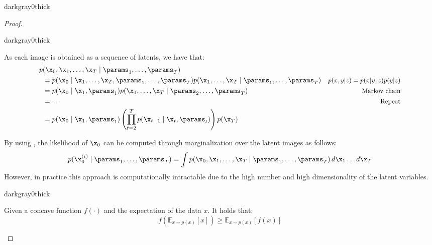 \begin{description}
\begin{description}
\begin{marginbar}{darkgray}{0}{thick}
\begin{proof}
                    \indenttbox
                    \begin{marginbar}{darkgray}{0}{thick}
                    \begin{lemma} \label{th:latents_joint}
                        As each image is obtained as a sequence of latents, we have that:
                        \begin{equation}
                            \begin{aligned}
                                p&(\x_0, \x_1, \dots, \x_T \mid \params_1, \dots, \params_T) \\
                                &= p(\x_0 \mid \x_1, \dots, \x_T, \params_1, \dots, \params_T) p(\x_1, \dots, \x_T \mid \params_1, \dots, \params_T) 
                                    & \text{\small $p(x, y | z) = p(x | y, z)p(y | z)$} \\
                                &= p(\x_0 \mid \x_1, \params_1) p(\x_1, \dots, \x_T \mid \params_2, \dots, \params_T) 
                                    & {\text{\small Markov chain}} \\
                                &= \dots & {\text{\small Repeat}} \\
                                &= p(\x_0 \mid \x_1, \params_1) \left( \prod_{t=2}^{T} p(\x_{t-1} \mid \x_t, \params_t) \right) p(\x_T)
                            \end{aligned}
                        \end{equation}
                    \end{lemma}
                    \end{marginbar}

                    By using , the likelihood of $\x_0$ can be computed through marginalization over the latent images as follows:
                    \[ p(\x_0^{(i)} \mid \params_1, \dots, \params_T) = \int p(\x_0, \x_1, \dots, \x_T \mid \params_1, \dots, \params_T) \, d\x_1 \dots d\x_T \]
                    However, in practice this approach is computationally intractable due to the high number and high dimensionality of the latent variables.

                    \indenttbox
                    \begin{marginbar}{darkgray}{0}{thick}
                    \begin{lemma}
                        Given a concave function $f(\cdot)$ and the expectation of the data $x$. It holds that:
                        \[ f(\mathbb{E}_{x \sim p(x)}[x]) \geq \mathbb{E}_{x \sim p(x)}[f(x)] \]


\end{lemma}
\end{marginbar}
\end{proof}
\end{marginbar}
\end{description}
\end{description}
